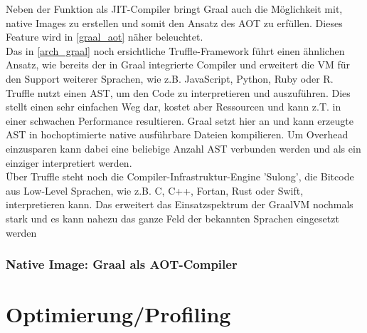 Neben der Funktion als \ac{JIT}-Compiler bringt Graal auch die Möglichkeit mit, native Images zu erstellen und somit den Ansatz des \ac{AOT} zu erfüllen. Dieses Feature wird in \autoref{graal_aot} näher beleuchtet.\\
Das in \autoref{arch_graal} noch ersichtliche Truffle-Framework führt einen ähnlichen Ansatz, wie bereits der in Graal integrierte Compiler und erweitert die \ac{VM} für den Support weiterer Sprachen, wie z.B. JavaScript, Python, Ruby oder R. Truffle nutzt einen \ac{AST}, um den Code zu interpretieren und auszuführen. Dies stellt einen sehr einfachen Weg dar, kostet aber Ressourcen und kann z.T. in einer schwachen Performance resultieren. Graal setzt hier an und kann erzeugte \ac{AST} in hochoptimierte native ausführbare Dateien kompilieren. Um Overhead einzusparen kann dabei eine beliebige Anzahl \ac{AST} verbunden werden und als ein einziger interpretiert werden.\\
Über Truffle steht noch die Compiler-Infrastruktur-Engine 'Sulong', die Bitcode aus Low-Level Sprachen, wie z.B. C, C++, Fortan, Rust oder Swift, interpretieren kann. Das erweitert das Einsatzspektrum der GraalVM nochmals stark und es kann nahezu das ganze Feld der bekannten Sprachen eingesetzt werden \cite[vgl. Sipek 2020, S.2]{Sipek_2020}
\subsubsection{Native Image: Graal als AOT-Compiler} \label{graal_aot}

\section{Optimierung/Profiling}
